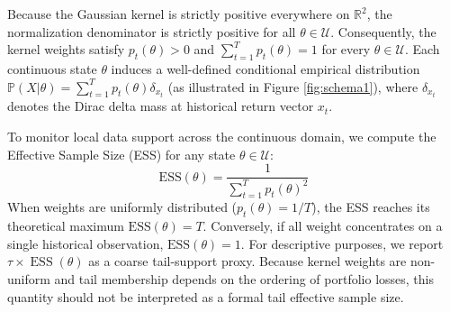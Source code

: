 \documentclass[smallextended]{svjour3}
\begin{document}
Because the Gaussian kernel is strictly positive everywhere on $\mathbb{R}^2$, the normalization denominator is strictly positive for all $\theta \in \mathcal{U}$. Consequently, the kernel weights satisfy $p_t(\theta) > 0$ and $\sum_{t=1}^T p_t(\theta) = 1$ for every $\theta \in \mathcal{U}$. Each continuous state $\theta$ induces a well-defined conditional empirical distribution $\mathbb{P}(X | \theta) = \sum_{t=1}^{T} p_t(\theta) \delta_{x_t}$ (as illustrated in Figure \ref{fig:schema1}), where $\delta_{x_t}$ denotes the Dirac delta mass at historical return vector $x_t$.

To monitor local data support across the continuous domain, we compute the Effective Sample Size (ESS) for any state $\theta \in \mathcal{U}$:
\begin{equation}
    \text{ESS}(\theta) = \frac{1}{\sum_{t=1}^T p_t(\theta)^2}
\end{equation}
When weights are uniformly distributed ($p_t(\theta) = 1/T$), the ESS reaches its theoretical maximum $\text{ESS}(\theta) = T$. Conversely, if all weight concentrates on a single historical observation, $\text{ESS}(\theta) = 1$. For descriptive purposes, we report $\tau\times \operatorname{ESS}(\theta)$ as a coarse tail-support proxy. Because kernel weights are non-uniform and tail membership depends on the ordering of portfolio losses, this quantity should not be interpreted as a formal tail effective sample size.
\end{document}
